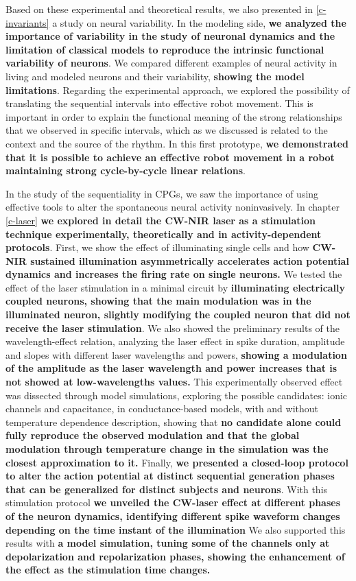 Based on these experimental and theoretical results, we also presented in \ref{c-invariants} a study on neural variability. In the modeling side, \textbf{we analyzed the importance of variability in the study of neuronal dynamics and the limitation of classical models to reproduce the intrinsic functional variability of neurons}. We compared different examples of neural activity in living and modeled neurons and their variability, \textbf{ showing the model limitations}. Regarding the experimental approach, we explored the possibility of translating the sequential intervals into effective robot movement. This is important in order to explain the functional meaning of the strong relationships that we observed in specific intervals, which as we discussed is related to the context and the source of the rhythm. In this first prototype, \textbf{we demonstrated that it is possible to achieve an effective robot movement in a robot maintaining strong cycle-by-cycle linear relations}.

In the study of the sequentiality in CPGs, we saw the importance of using effective tools to alter the spontaneous neural activity noninvasively. In chapter \ref{c-laser} \textbf{we explored in detail the CW-NIR laser as a stimulation technique experimentally, theoretically and in activity-dependent protocols}. First, we show the effect of illuminating single cells and how \textbf{CW-NIR sustained illumination asymmetrically accelerates action potential dynamics and increases the firing rate on single neurons.} We tested the effect of the laser stimulation in a minimal circuit by \textbf{illuminating electrically coupled neurons, showing that the main modulation was in the illuminated neuron, slightly modifying the coupled neuron that did not receive the laser stimulation}. We also showed the preliminary results of the wavelength-effect relation, analyzing the laser effect in spike duration, amplitude and slopes with different laser wavelengths and powers, \textbf{showing a modulation of the amplitude as the laser wavelength and power increases that is not showed at low-wavelengths values.} This experimentally observed effect was dissected through model simulations, exploring the possible candidates: ionic channels and capacitance, in conductance-based models, with and without temperature dependence description, showing that \textbf{no candidate alone could fully reproduce the observed modulation and that the global modulation through temperature change in the simulation was the closest approximation to it.} Finally, \textbf{we presented a closed-loop protocol to alter the action potential at distinct sequential generation phases that can be generalized for distinct subjects and neurons}. With this stimulation protocol \textbf{we unveiled the CW-laser effect at different phases of the neuron dynamics,  identifying different spike waveform changes depending on the time instant of the illumination} We also supported this results with \textbf{a model simulation, tuning some of the channels only at depolarization and repolarization phases, showing the enhancement of the effect as the stimulation time changes.}

